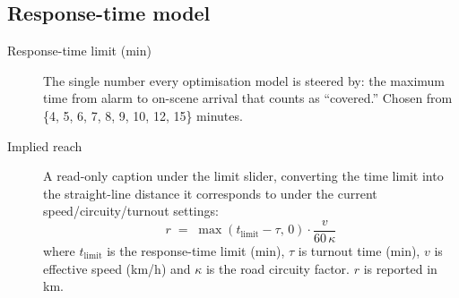 \documentclass[11pt]{article}
\begin{document}
\subsection{Response-time model}
\begin{description}
  \item[Response-time limit (min)] The single number every optimisation model
    is steered by: the maximum time from alarm to on-scene arrival that counts
    as ``covered.'' Chosen from \{4, 5, 6, 7, 8, 9, 10, 12, 15\} minutes.
  \item[Implied reach] A read-only caption under the limit slider, converting
    the time limit into the straight-line distance it corresponds to under the
    current speed/circuity/turnout settings:
    \[
      r \;=\; \max(t_{\text{limit}} - \tau,\,0)\cdot\frac{v}{60\,\kappa}
    \]
    where $t_{\text{limit}}$ is the response-time limit (min), $\tau$ is
    turnout time (min), $v$ is effective speed (km/h) and $\kappa$ is the road
    circuity factor. $r$ is reported in km.
\end{description}
\end{document}
